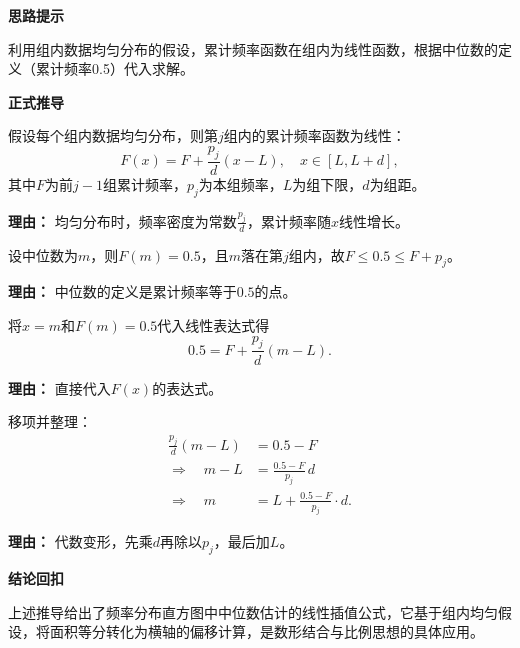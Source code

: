 \begin{proofbox}
	\textbf{\textcolor{CProof}{思路提示}}

	利用组内数据均匀分布的假设，累计频率函数在组内为线性函数，根据中位数的定义（累计频率0.5）代入求解。

	\medskip
	\textbf{\textcolor{CProof}{正式推导}}
	\begin{description}[style=nextline, leftmargin=2.8em, labelsep=0.5em, itemsep=0.55em]
		\item[\textbf{步骤一（均匀假设）：}] 假设每个组内数据均匀分布，则第$j$组内的累计频率函数为线性：
			\[
				F(x) = F + \frac{p_j}{d}(x - L), \quad x \in [L, L+d],
			\]
			其中$F$为前$j-1$组累计频率，$p_j$为本组频率，$L$为组下限，$d$为组距。
			\par\textbf{理由：} 均匀分布时，频率密度为常数$\frac{p_j}{d}$，累计频率随$x$线性增长。

		\item[\textbf{步骤二（中位数条件）：}] 设中位数为$m$，则$F(m)=0.5$，且$m$落在第$j$组内，故$F \le 0.5 \le F+p_j$。
			\par\textbf{理由：} 中位数的定义是累计频率等于$0.5$的点。

		\item[\textbf{步骤三（代入线性式）：}] 将$x=m$和$F(m)=0.5$代入线性表达式得
			\[
				0.5 = F + \frac{p_j}{d}(m - L).
			\]
			\par\textbf{理由：} 直接代入$F(x)$的表达式。

		\item[\textbf{步骤四（求解公式）：}] 移项并整理：
			\[
				\begin{aligned}
					\frac{p_j}{d}(m - L) &= 0.5 - F \\
					\Rightarrow\quad m - L &= \frac{0.5 - F}{p_j}\,d \\
					\Rightarrow\quad m &= L + \frac{0.5 - F}{p_j} \cdot d.
			\end{aligned}
			\]
			\par\textbf{理由：} 代数变形，先乘$d$再除以$p_j$，最后加$L$。
	\end{description}

	\medskip
	\textbf{\textcolor{CProof}{结论回扣}}

	上述推导给出了频率分布直方图中中位数估计的线性插值公式，它基于组内均匀假设，将面积等分转化为横轴的偏移计算，是数形结合与比例思想的具体应用。
\end{proofbox}
